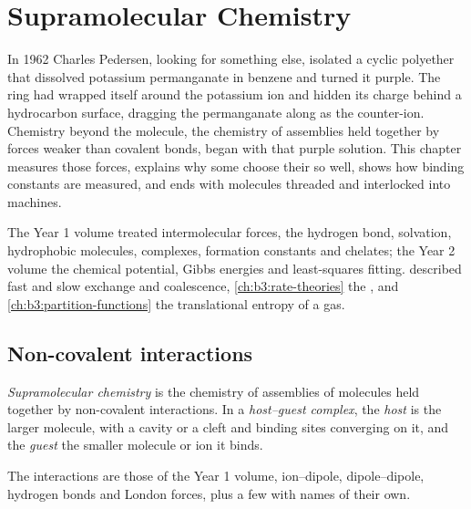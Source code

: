 \chapter{Supramolecular Chemistry}\label{ch:b3:supramolecular}

In 1962 Charles Pedersen, looking for something else, isolated a cyclic
polyether that dissolved potassium permanganate in benzene and turned it
purple. The ring had wrapped itself around the potassium ion and hidden its
charge behind a hydrocarbon surface, dragging the permanganate along as the
counter-ion. Chemistry beyond the molecule, the chemistry of assemblies held
together by forces weaker than covalent bonds, began with that purple solution.
This chapter measures those forces, explains why some  choose their 
so well, shows how binding constants are measured, and ends with molecules
threaded and interlocked into machines.

\begin{recall}
The Year 1 volume treated intermolecular forces, the hydrogen bond, solvation,
hydrophobic molecules, complexes, formation constants and chelates; the Year 2
volume the chemical potential, Gibbs energies and least-squares fitting.
 described fast and slow exchange and coalescence,
\cref{ch:b3:rate-theories} the , and
\cref{ch:b3:partition-functions} the translational entropy of a gas.
\end{recall}

\section{Non-covalent interactions}

\begin{definition}\label{def:b3:supramolecular:supramolecular}
\emph{Supramolecular chemistry} is the chemistry
of assemblies of molecules held together by non-covalent interactions. In a
\emph{host--guest complex}, the \emph{host}
is the larger molecule, with a cavity or a cleft and binding sites converging on
it, and the \emph{guest} the smaller molecule or ion it binds.
\end{definition}

The interactions are those of the Year 1 volume, ion--dipole, dipole--dipole,
hydrogen bonds and London forces, plus a few with names of their own.

